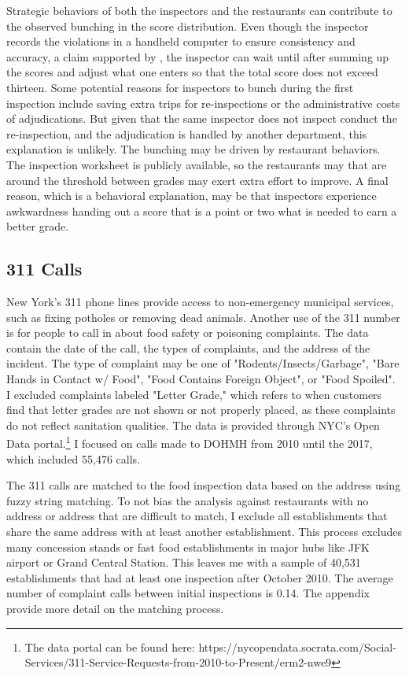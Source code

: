 \documentclass[12pt]{article}
\begin{document}
Strategic behaviors of both the inspectors and the restaurants can contribute to the observed bunching in the score distribution. Even though the inspector records the violations in a handheld computer to ensure consistency and accuracy, a claim supported by \cite{Jin_Lee_14}, the inspector can wait until after summing up the scores and adjust what one enters so that the total score does not exceed thirteen. Some potential reasons for inspectors to bunch during the first inspection include saving extra trips for re-inspections or the administrative costs of adjudications.  But given that the same inspector does not inspect conduct the re-inspection, and the adjudication is handled by another department, this explanation is unlikely. The bunching may be driven by restaurant behaviors. The inspection worksheet is publicly available, so the restaurants may that are around the threshold between grades may exert extra effort to improve. A final reason, which is a behavioral explanation, may be that inspectors experience awkwardness handing out a score that is a point or two what is needed to earn a better grade. 

\subsection{311 Calls}

New York's 311 phone lines provide access to non-emergency municipal services, such as fixing potholes or removing dead animals. Another use of the 311 number is for people to call in about food safety or poisoning complaints. The data contain the date of the call, the types of complaints, and the address of the incident. The type of complaint may be one of "Rodents/Insects/Garbage", "Bare Hands in Contact w/ Food", "Food Contains Foreign Object", or "Food Spoiled". I excluded complaints labeled "Letter Grade," which refers to when customers find that letter grades are not shown or not properly placed, as these complaints do not reflect sanitation qualities. The data is provided through NYC's Open Data portal.\footnote{The data portal can be found here: https://nycopendata.socrata.com/Social-Services/311-Service-Requests-from-2010-to-Present/erm2-nwe9} I focused on calls made to DOHMH from 2010 until the 2017, which included 55,476 calls.  

The 311 calls are matched to the food inspection data based on the address using fuzzy string matching. To not bias the analysis against restaurants with no address or address that are difficult to match, I exclude all establishments that share the same address with at least another establishment. This process excludes many concession stands or fast food establishments in major hubs like JFK airport or Grand Central Station. This leaves me with a sample of 40,531 establishments that had at least one inspection after October 2010. The average number of complaint calls between initial inspections is 0.14. The appendix provide more detail on the matching process. 
\end{document}
